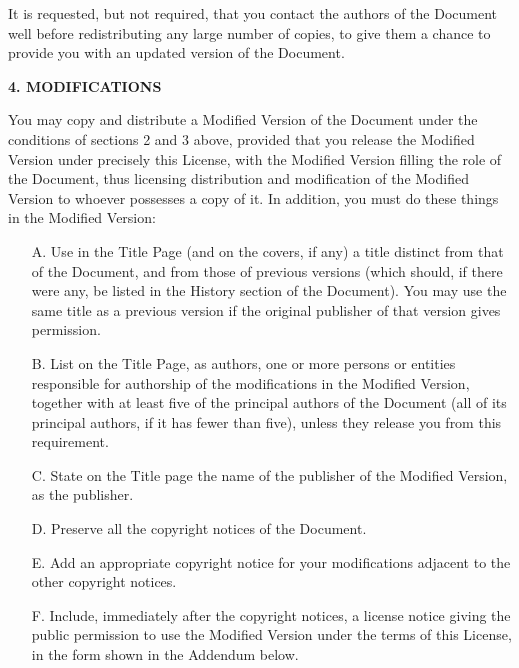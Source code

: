 \documentclass[10pt,a4paper,ngerman,titlepage,tocindentauto]{article}
\begin{document}
\begin{multicols}{3}
{				It is requested, but not required, that you contact the authors of the
				Document well before redistributing any large number of copies, to give
				them a chance to provide you with an updated version of the Document.


				\begin{center}
				{\bf 4. MODIFICATIONS\par}
				\end{center}

				You may copy and distribute a Modified Version of the Document under
				the conditions of sections 2 and 3 above, provided that you release
				the Modified Version under precisely this License, with the Modified
				Version filling the role of the Document, thus licensing distribution
				and modification of the Modified Version to whoever possesses a copy
				of it.  In addition, you must do these things in the Modified Version:

				\begin{itemize}
				\item[A.] 
					Use in the Title Page (and on the covers, if any) a title distinct
					from that of the Document, and from those of previous versions
					(which should, if there were any, be listed in the History section
					of the Document).  You may use the same title as a previous version
					if the original publisher of that version gives permission.
					
				\item[B.]
					List on the Title Page, as authors, one or more persons or entities
					responsible for authorship of the modifications in the Modified
					Version, together with at least five of the principal authors of the
					Document (all of its principal authors, if it has fewer than five),
					unless they release you from this requirement.
					
				\item[C.]
					State on the Title page the name of the publisher of the
					Modified Version, as the publisher.
					
				\item[D.]
					Preserve all the copyright notices of the Document.
					
				\item[E.]
					Add an appropriate copyright notice for your modifications
					adjacent to the other copyright notices.
					
				\item[F.]
					Include, immediately after the copyright notices, a license notice
					giving the public permission to use the Modified Version under the
					terms of this License, in the form shown in the Addendum below.
					

\end{itemize}}
\end{multicols}
\end{document}
